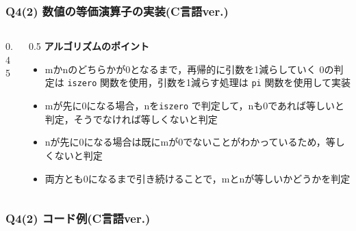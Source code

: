 \begin{frame}[fragile]
\frametitle{Q4(2) 数値の等価演算子の実装(C言語ver.)}
    \begin{columns}[c]
        
        \begin{column}{0.45\textwidth}
            
        \end{column}
        
        \begin{column}{0.5\textwidth}
            \small
            \textbf{アルゴリズムのポイント}
            \begin{itemize}
                \item mかnのどちらかが0となるまで，再帰的に引数を1減らしていく
                0の判定は \texttt{iszero} 関数を使用，引数を1減らす処理は \texttt{pi} 関数を使用して実装
                \item mが先に0になる場合，nを\texttt{iszero} で判定して，nも0であれば等しいと判定，そうでなければ等しくないと判定
                \item nが先に0になる場合は既にmが0でないことがわかっているため，等しくないと判定
                \item 両方とも0になるまで引き続けることで，mとnが等しいかどうかを判定
            \end{itemize}
        \end{column}
    \end{columns}
\end{frame}

\begin{frame}[fragile]
\frametitle{Q4(2) コード例(C言語ver.)}
    
\end{frame}

